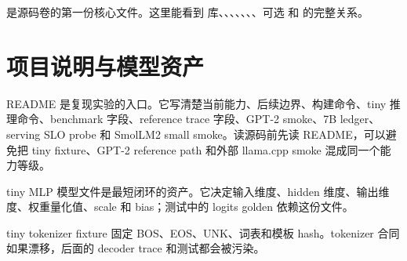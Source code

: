  是源码卷的第一份核心文件。这里能看到  库、、、、、、、可选  和  的完整关系。



\section{项目说明与模型资产}

README 是复现实验的入口。它写清楚当前能力、后续边界、构建命令、tiny 推理命令、benchmark 字段、reference trace 字段、GPT-2 smoke、7B ledger、serving SLO probe 和 SmolLM2 small smoke。读源码前先读 README，可以避免把 tiny fixture、GPT-2 reference path 和外部 llama.cpp smoke 混成同一个能力等级。



tiny MLP 模型文件是最短闭环的资产。它决定输入维度、hidden 维度、输出维度、权重量化值、scale 和 bias；测试中的 logits golden 依赖这份文件。



tiny tokenizer fixture 固定 BOS、EOS、UNK、词表和模板 hash。tokenizer 合同如果漂移，后面的 decoder trace 和测试都会被污染。


